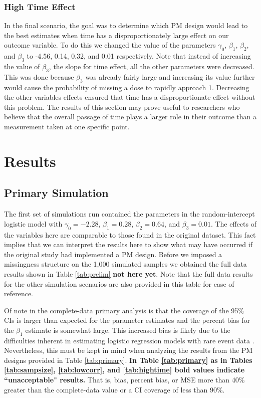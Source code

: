 \documentclass{svjour3}\usepackage[]{graphicx}\usepackage[]{color}
\begin{document}
\subsubsection{High Time Effect}
In the final scenario, the goal was to determine which PM design would lead to the best estimates when time has a disproportionately large effect on our outcome variable. To do this we changed the value of the parameters $\gamma_0$, $\beta_1$, $\beta_2$, and $\beta_3$ to -4.56, 0.14, 0.32, and 0.01 respectively. Note that instead of increasing the value of $\beta_3$, the slope for time effect, all the other parameters were decreased. This was done because $\beta_3$ was already fairly large and increasing its value further would cause the probability of missing a dose to rapidly approach 1. Decreasing the other variables effects ensured that time has a disproportionate effect without this problem. The results of this section may prove useful to researchers who believe that the overall passage of time plays a larger role in their outcome than a measurement taken at one specific point. \par

\section{Results}
\label{sec:3}
\subsection{Primary Simulation}
\label{sec:3.1}
The first set of simulations run contained the parameters in the random-intercept logistic model with $\gamma_0 = -2.28$, $\beta_1 = 0.28$, $\beta_2 = 0.64$, and $\beta_3 = 0.01$. The effects of the variables here are comparable to those found in the original dataset. This fact implies that we can interpret the results here to show what may have occurred if the original study had implemented a PM design. Before we imposed a missingness structure on the 1,000 simulated samples we obtained the full data results shown in Table \ref{tab:prelim} \textbf{not here yet}. Note that the full data results for the other simulation scenarios are also provided in this table for ease of reference.



Of note in the complete-data primary analysis is that the coverage of the 95\% CIs is larger than expected for the parameter estimates and the percent bias for the $\beta_1$ estimate is somewhat large. This increased bias is likely due to the difficulties inherent in estimating logistic regression models with rare event data \citep{king2001logistic}. Nevertheless, this must be kept in mind when analyzing the results from the PM designs provided in Table \ref{tab:primary}. \textbf{In Table \ref{tab:primary} as in Tables \ref{tab:sampsize}, \ref{tab:lowcorr}, and \ref{tab:hightime} bold values indicate ``unacceptable" results.} That is, bias, percent bias, or MSE more than 40\% greater than the complete-data value or a CI coverage of less than 90\%.
\end{document}
